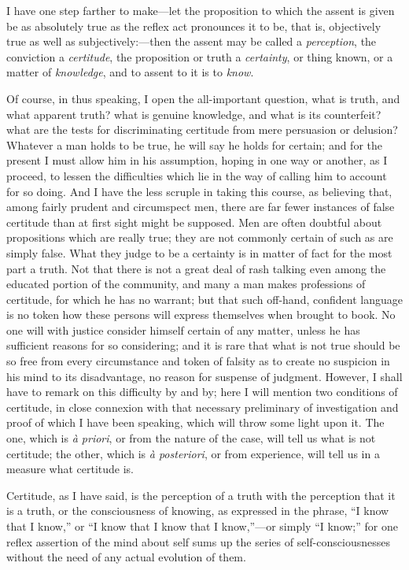 I have one step farther to make—let the proposition to which the
assent is given be as absolutely true as the reflex act pronounces it
to be, that is, objectively true as well as subjectively:—then
the assent may be called a \emph{perception}, the conviction a \emph{certitude},
the proposition or truth a \emph{certainty}, or thing known, or a
matter of \emph{knowledge}, and to assent to it is to \emph{know}.

Of course, in thus speaking, I open the all-important question,
what is truth, and what apparent truth? what is genuine knowledge, and
what is its counterfeit? what are the tests for discriminating
certitude from mere persuasion or delusion? Whatever a man holds to be
true, he will say he holds for certain; and for the present I must
allow him in his assumption, hoping in one way or another, as I
proceed, to lessen the difficulties which lie in the way of calling
him to account for so doing. And I have the less scruple in taking
this course, as believing that, among fairly prudent and circumspect
men, there are far fewer instances of false certitude than at first
sight might be supposed. Men are often doubtful about propositions
which are really true; they are not commonly certain of such as are
simply false. What they judge to be a certainty is in matter of fact
for the most part a truth. Not that there is not a great deal of rash
talking even among the educated portion of the community, and many a
man makes professions of certitude, for which he has no warrant; but
that such off-hand, confident language is no token how these persons
will express themselves when brought to book. No one will with justice
consider himself certain of any matter, unless he has sufficient
reasons for so considering; and it is rare that what is not true
should be so free from every circumstance and token of falsity as to
create no suspicion in his mind to its disadvantage, no reason
for suspense of judgment. However, I shall have to remark on this
difficulty by and by; here I will mention two conditions of certitude,
in close connexion with that necessary preliminary of investigation
and proof of which I have been speaking, which will throw some light
upon it. The one, which is \emph{à priori}, or from the nature of the
case, will tell us what is not certitude; the other, which is \emph{à
posteriori}, or from experience, will tell us in a measure what
certitude is.

Certitude, as I have said, is the perception of a truth with the
perception that it is a truth, or the consciousness of knowing, as
expressed in the phrase, ``I know that I know,'' or ``I
know that I know that I know,''—or simply ``I know;''
for one reflex assertion of the mind about self sums up the series of
self-consciousnesses without the need of any actual evolution of them.

